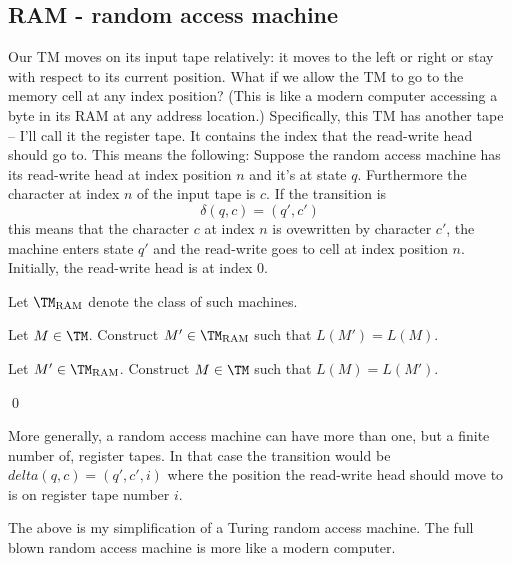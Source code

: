 \subsection{RAM - random access machine}

Our TM moves on its input tape relatively: it moves to the left or right or
stay with respect to its current position.
What if we allow the TM to go to the memory cell at any index
position?
(This is like a modern computer accessing a byte in its RAM at
any address location.)
Specifically, this TM has another tape -- I'll call it the register tape.
It contains the index that the read-write head should go to.
This means the following:
Suppose the random access machine has its read-write head at index
position $n$ and it's at state $q$.
Furthermore the character at index $n$ of the input tape is $c$.
If the transition is
\[
\delta(q, c) = (q', c')
\]
this means that the character $c$ at index $n$ is ovewritten by character
$c'$, the machine enters state $q'$ and the read-write goes to
cell at index position $n$.
Initially, the read-write head is at index 0.

Let $\TM_{\operatorname{RAM}}$ denote the class of such machines.

\begin{ex}
  \begin{tightlist}
    \item Let $M \in \TM$. Construct $M' \in \TM_{\operatorname{RAM}}$
    such that $L(M') = L(M)$.
    \item Let $M' \in \TM_{\operatorname{RAM}}$.
    Construct $M \in \TM$ such that $L(M) = L(M')$.
  \end{tightlist}
\qed
\end{ex}

More generally, a random access machine can have more than one, but a
finite number of, register tapes.
In that case the transition would be $delta(q, c) = (q', c', i)$
where the position the read-write head should move to is on register
tape number $i$.

The above is my simplification of a Turing random access machine.
The full blown random access machine is more like a modern computer.

